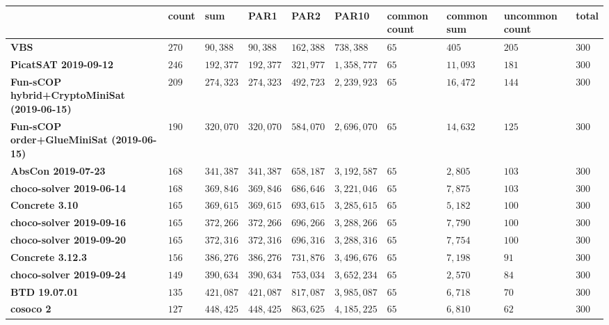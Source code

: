 \begin{tabular}{llllllllll}
\toprule
{} &  count &        sum &       PAR1 &       PAR2 &        PAR10 & common count & common sum & uncommon count &  total \\
\midrule
\textbf{VBS                                       } &  $270$ &   $90,388$ &   $90,388$ &  $162,388$ &    $738,388$ &         $65$ &      $405$ &          $205$ &  $300$ \\
\textbf{PicatSAT 2019-09-12                       } &  $246$ &  $192,377$ &  $192,377$ &  $321,977$ &  $1,358,777$ &         $65$ &   $11,093$ &          $181$ &  $300$ \\
\textbf{Fun-sCOP hybrid+CryptoMiniSat (2019-06-15)} &  $209$ &  $274,323$ &  $274,323$ &  $492,723$ &  $2,239,923$ &         $65$ &   $16,472$ &          $144$ &  $300$ \\
\textbf{Fun-sCOP order+GlueMiniSat (2019-06-15)   } &  $190$ &  $320,070$ &  $320,070$ &  $584,070$ &  $2,696,070$ &         $65$ &   $14,632$ &          $125$ &  $300$ \\
\textbf{AbsCon 2019-07-23                         } &  $168$ &  $341,387$ &  $341,387$ &  $658,187$ &  $3,192,587$ &         $65$ &    $2,805$ &          $103$ &  $300$ \\
\textbf{choco-solver 2019-06-14                   } &  $168$ &  $369,846$ &  $369,846$ &  $686,646$ &  $3,221,046$ &         $65$ &    $7,875$ &          $103$ &  $300$ \\
\textbf{Concrete 3.10                             } &  $165$ &  $369,615$ &  $369,615$ &  $693,615$ &  $3,285,615$ &         $65$ &    $5,182$ &          $100$ &  $300$ \\
\textbf{choco-solver 2019-09-16                   } &  $165$ &  $372,266$ &  $372,266$ &  $696,266$ &  $3,288,266$ &         $65$ &    $7,790$ &          $100$ &  $300$ \\
\textbf{choco-solver 2019-09-20                   } &  $165$ &  $372,316$ &  $372,316$ &  $696,316$ &  $3,288,316$ &         $65$ &    $7,754$ &          $100$ &  $300$ \\
\textbf{Concrete 3.12.3                           } &  $156$ &  $386,276$ &  $386,276$ &  $731,876$ &  $3,496,676$ &         $65$ &    $7,198$ &           $91$ &  $300$ \\
\textbf{choco-solver 2019-09-24                   } &  $149$ &  $390,634$ &  $390,634$ &  $753,034$ &  $3,652,234$ &         $65$ &    $2,570$ &           $84$ &  $300$ \\
\textbf{BTD 19.07.01                              } &  $135$ &  $421,087$ &  $421,087$ &  $817,087$ &  $3,985,087$ &         $65$ &    $6,718$ &           $70$ &  $300$ \\
\textbf{cosoco 2                                  } &  $127$ &  $448,425$ &  $448,425$ &  $863,625$ &  $4,185,225$ &         $65$ &    $6,810$ &           $62$ &  $300$ \\
\bottomrule
\end{tabular}
